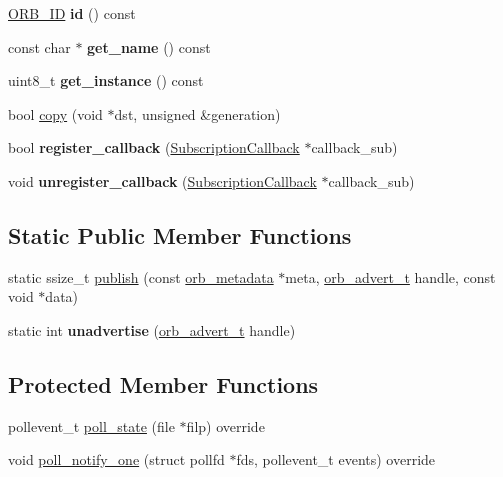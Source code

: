\begin{DoxyCompactItemize}
\hyperlink{uORB_8h_a96af5434ec1acdf24287bd7851b0413f}{O\+R\+B\+\_\+\+ID} {\bfseries id} () const
\item 
\mbox{\label{classuORB_1_1DeviceNode_aa99462996e1d4f1fc66bd3ca4dd5a3c0}} 
const char $\ast$ {\bfseries get\+\_\+name} () const
\item 
\mbox{\label{classuORB_1_1DeviceNode_aa60643d933d54020c5b9201470b8e3c6}} 
uint8\+\_\+t {\bfseries get\+\_\+instance} () const
\item 
bool \hyperlink{classuORB_1_1DeviceNode_a89d9a792e1e38e04c65baba20f29d780}{copy} (void $\ast$dst, unsigned \&generation)
\item 
\mbox{\label{classuORB_1_1DeviceNode_a402819fd9ba1c33e39389a47406b5ff7}} 
bool {\bfseries register\+\_\+callback} (\hyperlink{classuORB_1_1SubscriptionCallback}{Subscription\+Callback} $\ast$callback\+\_\+sub)
\item 
\mbox{\label{classuORB_1_1DeviceNode_aaaafc67863a203c52647a8dab4f48f2e}} 
void {\bfseries unregister\+\_\+callback} (\hyperlink{classuORB_1_1SubscriptionCallback}{Subscription\+Callback} $\ast$callback\+\_\+sub)
\end{DoxyCompactItemize}
\subsection*{Static Public Member Functions}
\begin{DoxyCompactItemize}
\item 
static ssize\+\_\+t \hyperlink{classuORB_1_1DeviceNode_ae715517a1f3a2f361e37d061b59a4560}{publish} (const \hyperlink{structorb__metadata}{orb\+\_\+metadata} $\ast$meta, \hyperlink{uORB_8h_a8d0cfa5f9ea6427a37057d6cea6dd990}{orb\+\_\+advert\+\_\+t} handle, const void $\ast$data)
\item 
\mbox{\label{classuORB_1_1DeviceNode_a07672cd375d8067080b76b8773659289}} 
static int {\bfseries unadvertise} (\hyperlink{uORB_8h_a8d0cfa5f9ea6427a37057d6cea6dd990}{orb\+\_\+advert\+\_\+t} handle)
\end{DoxyCompactItemize}
\subsection*{Protected Member Functions}
\begin{DoxyCompactItemize}
\item 
pollevent\+\_\+t \hyperlink{classuORB_1_1DeviceNode_a3ac7d5c93e5fd480cd623fd421afa060}{poll\+\_\+state} (file $\ast$filp) override
\item 
void \hyperlink{classuORB_1_1DeviceNode_a77061c03defdcb3eedfc9cdc8b38c003}{poll\+\_\+notify\+\_\+one} (struct pollfd $\ast$fds, pollevent\+\_\+t events) override
\end{DoxyCompactItemize}
